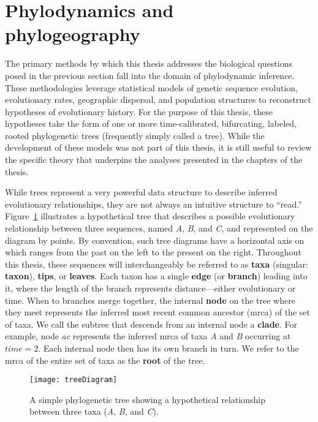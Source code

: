 \section{Phylodynamics and phylogeography}
The primary methods by which this thesis addresses the biological questions posed in the previous section fall into the domain of phylodynamic inference.
These methodologies leverage statistical models of genetic sequence evolution, evolutionary rates, geographic dispersal, and population structures to reconstruct hypotheses of evolutionary history.
For the purpose of this thesis, these hypotheses take the form of one or more time-calibrated, bifurcating, labeled, rooted phylogenetic trees (frequently simply called a tree).
While the development of these models was not part of this thesis, it is still useful to review the specific theory that underpins the analyses presented in the chapters of the thesis.

While trees represent a very powerful data structure to describe inferred evolutionary relationships, they are not always an intuitive structure to ``read.''
Figure~\ref{fig:treeDiagram} illustrates a hypothetical tree that describes a possible evolutionary relationship between three sequences, named \textit{A}, \textit{B}, and \textit{C}, and represented on the diagram by points.
By convention, such tree diagrams have a horizontal axis on which ranges from the past on the left to the present on the right.
Throughout this thesis, these sequences will interchangeably be referred to as \textbf{taxa} (singular: \textbf{taxon}), \textbf{tips}, or \textbf{leaves}.
Each taxon has a single \textbf{edge} (or \textbf{branch}) leading into it, where the length of the branch represents distance---either evolutionary or time.
When to branches merge together, the internal \textbf{node} on the tree where they meet represents the inferred most recent common ancestor (\gls{mrca}) of the set of taxa.
We call the subtree that descends from an internal node a \textbf{clade}.
For example, node \textit{ac} represents the inferred \gls{mrca} of taxa \textit{A} and \textit{B} occurring at $time=2$.
Each internal node then has its own branch in turn.
We refer to the \gls{mrca} of the entire set of taxa as the \textbf{root} of the tree. 

\begin{figure}[ht]
  \centering
  \texttt{[image: treeDiagram]}
  \caption[Example phylogenetic tree]{A simple phylogenetic tree showing a hypothetical relationship between three taxa (\textit{A}, \textit{B}, and \textit{C}).
  }
  \label{fig:treeDiagram}
\end{figure}

